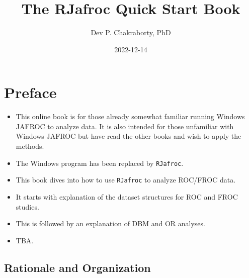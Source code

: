 \documentclass[
]{book}
\title{The RJafroc Quick Start Book}
\author{Dev P. Chakraborty, PhD}
\date{2022-12-14}
\providecommand{\tightlist}{%
  \setlength{\itemsep}{0pt}\setlength{\parskip}{0pt}}
\begin{document}
\maketitle

{
\setcounter{tocdepth}{1}
\tableofcontents
}
\hypertarget{quick-start-index-preface}{%
\chapter{Preface}\label{quick-start-index-preface}}

\begin{itemize}
\tightlist
\item
  This online book is for those already somewhat familiar running Windows JAFROC to analyze data. It is also intended for those unfamiliar with Windows JAFROC but have read the other books and wish to apply the methods.
\item
  The Windows program has been replaced by \texttt{RJafroc}.
\item
  This book dives into how to use \texttt{RJafroc} to analyze ROC/FROC data.
\item
  It starts with explanation of the dataset structures for ROC and FROC studies.
\item
  This is followed by an explanation of DBM and OR analyses.
\item
  TBA.
\end{itemize}

\hypertarget{quick-start-index-rationale-and-organization}{%
\section{Rationale and Organization}\label{quick-start-index-rationale-and-organization}}
\end{document}
